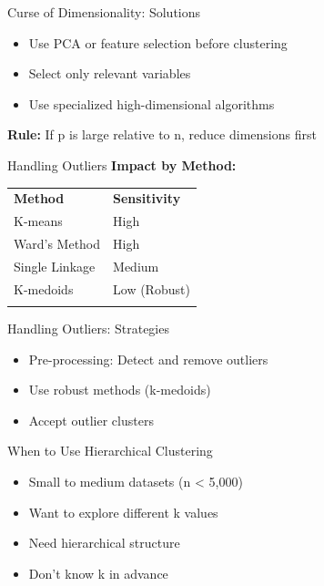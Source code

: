 \documentclass[aspectratio=169,ignorenonframetext]{beamer}
\begin{document}
\begin{frame}{Curse of Dimensionality: Solutions}
\begin{itemize}
\item
  Use PCA or feature selection before clustering
\item
  Select only relevant variables
\item
  Use specialized high-dimensional algorithms
\end{itemize}

\textbf{Rule:} If p is large relative to n, reduce dimensions first
\end{frame}

\begin{frame}{Handling Outliers}
\textbf{Impact by Method:}

{\def\LTcaptype{none} %
\begin{longtable}[]{@{}
  >{\raggedright\arraybackslash}p{}
  >{\centering\arraybackslash}p{}@{}}
\toprule\noalign{}
\endhead
\textbf{Method} & \textbf{Sensitivity} \\
K-means & High \\
Ward's Method & High \\
Single Linkage & Medium \\
K-medoids & Low (Robust) \\
\bottomrule\noalign{}
\end{longtable}
}
\end{frame}

\begin{frame}{Handling Outliers: Strategies}
\begin{itemize}
\item
  Pre-processing: Detect and remove outliers
\item
  Use robust methods (k-medoids)
\item
  Accept outlier clusters
\end{itemize}
\end{frame}

\begin{frame}{When to Use Hierarchical Clustering}
\begin{itemize}
\item
  Small to medium datasets (n \textless{} 5,000)
\item
  Want to explore different k values
\item
  Need hierarchical structure
\item
  Don't know k in advance
\end{itemize}
\end{frame}
\end{document}
